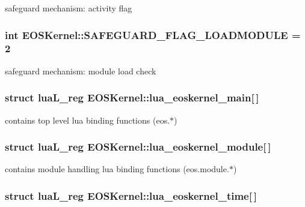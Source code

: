 safeguard mechanism: activity flag 

\hypertarget{structEOSKernel_c97927724be5b7c2eebf92739155ca0d}{
\subsubsection[{SAFEGUARD\_\-FLAG\_\-LOADMODULE}]{\setlength{\rightskip}{0pt plus 5cm}int {\bf EOSKernel::SAFEGUARD\_\-FLAG\_\-LOADMODULE} = 2}}
\label{structEOSKernel_c97927724be5b7c2eebf92739155ca0d}


safeguard mechanism: module load check 

\hypertarget{structEOSKernel_b6b80a3e788ce2d8efcfc693d1e2e24c}{
\subsubsection[{lua\_\-eoskernel\_\-main}]{\setlength{\rightskip}{0pt plus 5cm}struct luaL\_\-reg {\bf EOSKernel::lua\_\-eoskernel\_\-main}\mbox{[}$\,$\mbox{]}}}
\label{structEOSKernel_b6b80a3e788ce2d8efcfc693d1e2e24c}


contains top level lua binding functions (eos.$\ast$) 

\hypertarget{structEOSKernel_369f2e0709ea1be66f5f47dd5e861025}{
\subsubsection[{lua\_\-eoskernel\_\-module}]{\setlength{\rightskip}{0pt plus 5cm}struct luaL\_\-reg {\bf EOSKernel::lua\_\-eoskernel\_\-module}\mbox{[}$\,$\mbox{]}}}
\label{structEOSKernel_369f2e0709ea1be66f5f47dd5e861025}


contains module handling lua binding functions (eos.module.$\ast$) 

\hypertarget{structEOSKernel_ffcec7d380b132f1dbebfd46b83f5c8d}{
\subsubsection[{lua\_\-eoskernel\_\-time}]{\setlength{\rightskip}{0pt plus 5cm}struct luaL\_\-reg {\bf EOSKernel::lua\_\-eoskernel\_\-time}\mbox{[}$\,$\mbox{]}}}
\label{structEOSKernel_ffcec7d380b132f1dbebfd46b83f5c8d}


